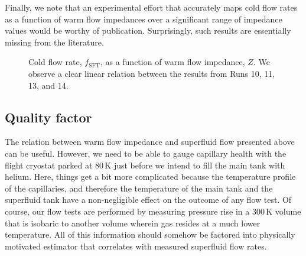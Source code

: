 \documentclass[
12pt, %
letterpaper, %
oneside, %
headinclude, footinclude, %
BCOR5mm, %
]{scrartcl}
\newcommand{\mrm}[1]{\mathrm{#1}}
\begin{document}
Finally, we note that an experimental effort that accurately maps cold flow rates as a function of warm flow impedances over a significant range of impedance values would be worthy of publication. Surprisingly, such results are essentially missing from the literature.

\begin{figure}[t]
\begin{center}
\end{center}
\caption[Cold flow rate vs warm flow impedance]{Cold flow rate, $f_\mrm{SFT}$, as a function of warm flow impedance, $Z$. We observe a clear linear relation between the results from Runs 10, 11, 13, and 14.}
\label{fig:flowvsz}
\end{figure} 

\subsection{Quality factor}
\label{sec:qf}

The relation between warm flow impedance and superfluid flow presented above can be useful. However, we need to be able to gauge capillary health with the flight cryostat parked at 80\,K just before we intend to fill the main tank with helium. Here, things get a bit more complicated because the temperature profile of the capillaries, and therefore the temperature of the main tank and the superfluid tank have a non-negligible effect on the outcome of any flow test. Of course, our flow tests are performed by measuring pressure rise in a 300\,K volume that is isobaric to another volume wherein gas resides at a much lower temperature. All of this information should somehow be factored into physically motivated estimator that correlates with measured superfluid flow rates.
\end{document}
